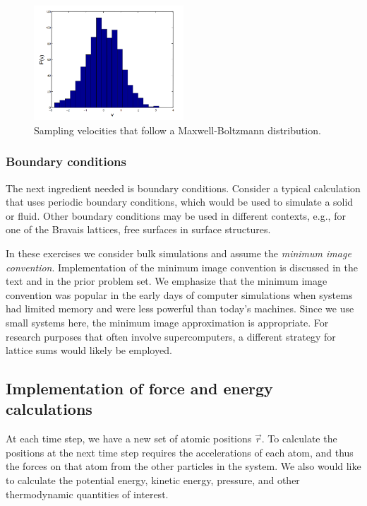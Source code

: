 \documentclass[11pt]{article}
\begin{document}
\begin{figure}
\centering
\includegraphics[width=0.5\textwidth]{./figs/MB_distribution.png}
\caption{Sampling velocities that follow a Maxwell-Boltzmann distribution.}
\end{figure}

    \hypertarget{boundary-conditions}{%
\subsubsection{Boundary conditions}\label{boundary-conditions}}

The next ingredient needed is boundary conditions. Consider a typical
calculation that uses periodic boundary conditions, which would be used
to simulate a solid or fluid. Other boundary conditions may be used in
different contexts, e.g., for one of the Bravais lattices, free surfaces
in surface structures.

In these exercises we consider bulk simulations and assume the
\emph{minimum image convention}. Implementation of the minimum image
convention is discussed in the text and in the prior problem set. We
emphasize that the minimum image convention was popular in the early
days of computer simulations when systems had limited memory and were
less powerful than today's machines. Since we use small systems here,
the minimum image approximation is appropriate. For research purposes
that often involve supercomputers, a different strategy for lattice sums
would likely be employed.

\hypertarget{implementation-of-force-and-energy-calculations}{%
\subsection{Implementation of force and energy
calculations}\label{implementation-of-force-and-energy-calculations}}

At each time step, we have a new set of atomic positions \(\vec{r}\). To
calculate the positions at the next time step requires the accelerations
of each atom, and thus the forces on that atom from the other particles
in the system. We also would like to calculate the potential energy,
kinetic energy, pressure, and other thermodynamic quantities of
interest.
\end{document}
